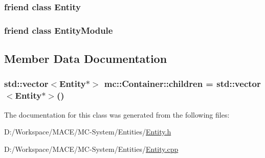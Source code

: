 \subsubsection[{\texorpdfstring{Entity}{Entity}}]{\setlength{\rightskip}{0pt plus 5cm}friend class {\bf Entity}\hspace{0.3cm}{\ttfamily [friend]}}\hypertarget{classmc_1_1_container_a614439ccac0344926adc4c0165d64060}{}\label{classmc_1_1_container_a614439ccac0344926adc4c0165d64060}
\subsubsection[{\texorpdfstring{Entity\+Module}{EntityModule}}]{\setlength{\rightskip}{0pt plus 5cm}friend class {\bf Entity\+Module}\hspace{0.3cm}{\ttfamily [friend]}}\hypertarget{classmc_1_1_container_a8dbbff2e42cb66216ff15cfa5272a1c9}{}\label{classmc_1_1_container_a8dbbff2e42cb66216ff15cfa5272a1c9}


\subsection{Member Data Documentation}
\subsubsection[{\texorpdfstring{children}{children}}]{\setlength{\rightskip}{0pt plus 5cm}std\+::vector$<${\bf Entity}$\ast$$>$ mc\+::\+Container\+::children = std\+::vector$<${\bf Entity}$\ast$$>$()\hspace{0.3cm}{\ttfamily [protected]}}\hypertarget{classmc_1_1_container_a61ab3823bf33ae5f8f1bfdb79501b242}{}\label{classmc_1_1_container_a61ab3823bf33ae5f8f1bfdb79501b242}


The documentation for this class was generated from the following files\+:\begin{DoxyCompactItemize}
\item 
D\+:/\+Workspace/\+M\+A\+C\+E/\+M\+C-\/\+System/\+Entities/\hyperlink{_entity_8h}{Entity.\+h}\item 
D\+:/\+Workspace/\+M\+A\+C\+E/\+M\+C-\/\+System/\+Entities/\hyperlink{_entity_8cpp}{Entity.\+cpp}\end{DoxyCompactItemize}
